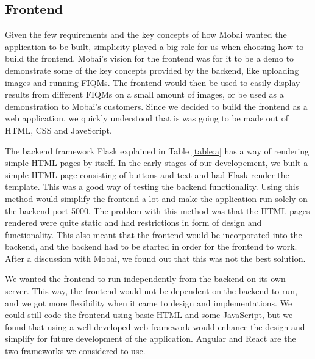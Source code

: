 \subsection*{Frontend}
Given the few requirements and the key concepts of how Mobai wanted the application to be built, simplicity played a big role for us when choosing how to build the frontend. Mobai's vision for the frontend was for it to be a demo to demonstrate some of the key concepts provided by the backend, like uploading images and running FIQMs. The frontend would then be used to easily display results from different FIQMs on a small amount of images, or be used as a demonstration to Mobai's customers. Since we decided to build the frontend as a web application, we quickly understood that is was going to be made out of HTML, CSS and JaveScript.

The backend framework Flask explained in Table \ref{table:a}  has a way of rendering simple HTML pages by itself. In the early stages of our developement, we built a simple HTML page consisting of buttons and text and had Flask render the template. This was a good way of testing the backend functionality. Using this method would simplify the frontend a lot and make the application run solely on the backend port 5000. The problem with this method was that the HTML pages rendered were quite static and had restrictions in form of design and functionality. This also meant that the frontend would be incorporated into the backend, and the backend had to be started in order for the frontend to work. After a discussion with Mobai, we found out that this was not the best solution.

We wanted the frontend to run independently from the backend on its own server. This way, the frontend would not be dependent on the backend to run, and we got more flexibility when it came to design and implementations. We could still code the frontend using basic HTML and some JavaScript, but we found that using a well developed web framework would enhance the design and simplify for future development of the application. Angular and React are the two frameworks we considered to use. 



